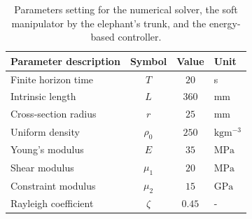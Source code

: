 \clearpage
\begin{table}[t]
\vspace{0.2cm}
\caption{Parameters setting for the numerical solver, the soft manipulator  by the elephant's trunk, and the energy-based controller.}\label{tab:C3:parameters2} \centering
\begin{tabular}{l|c|c|l}
  Parameter description & Symbol    & Value    & Unit                     \\
  \midrule
  Finite horizon time   & $T $      & $20$     & s                        \\
  Intrinsic length      & $L $      & $ 360$   & mm                       \\
  Cross-section radius  & $r $      & $ 25$    & $\text{mm}$              \\
  Uniform density       & $\rho_0 $ & $ 250$   & $\text{kg}\text{m}^{-3}$ \\
  Young's modulus       & $E $      & $ 35$    & $\text{MPa}$             \\
  Shear modulus         & $\mu_1 $  & $ 20 $   & $\text{MPa}$             \\
  Constraint modulus    & $\mu_2 $  & $ 15 $   & $\text{GPa}$             \\
  Rayleigh coefficient  & $\zeta $  & $ 0.45 $ & -                        \\
  \bottomrule
\end{tabular}
\end{table}
%